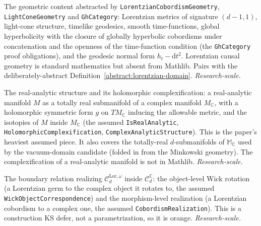 \begin{definition}
  \label{found:lorentzian-causal-geometry}
  \notready
  The geometric content abstracted by \texttt{LorentzianCobordismGeometry},
  \texttt{LightConeGeometry} and \texttt{GhCategory}: Lorentzian metrics of signature
  $(d-1,1)$, light-cone structure, timelike geodesics, smooth time-functions, global
  hyperbolicity with the closure of globally hyperbolic cobordisms under concatenation and
  the openness of the time-function condition (the \texttt{GhCategory} proof obligations),
  and the geodesic normal form $h_t - \mathrm dt^2$. Lorentzian causal
  geometry is standard mathematics but absent from Mathlib. Pairs with the
  deliberately-abstract Definition~\ref{abstract:lorentzian-domain}.
  \emph{Research-scale.}
\end{definition}

\begin{definition}
  \label{found:real-analytic-complexification}
  \notready
  The real-analytic structure and its holomorphic complexification: a real-analytic
  manifold $M$ as a totally real submanifold of a complex manifold $M_{\mathbb C}$, with a
  holomorphic symmetric form $g$ on $TM_{\mathbb C}$ inducing the allowable metric, and the
  isotopies of $M$ inside $M_{\mathbb C}$ (the assumed \texttt{IsRealAnalytic},
  \texttt{HolomorphicComplexification}, \texttt{ComplexAnalyticStructure}). This is the
  paper's heaviest assumed piece. It also covers the totally-real $d$-submanifolds of
  $\mathbb M_{\mathbb C}$ used by the vacuum-domain candidate (folded in from the
  Minkowski geometry). The complexification of a real-analytic manifold is not in Mathlib.
  \emph{Research-scale.}
\end{definition}

\begin{definition}
  \label{found:wick-correspondence}
  \notready
  The boundary relation realizing $\mathcal C_d^{\mathrm{Lor},\omega}$ inside
  $\mathcal C_d^{\mathbb C}$: the object-level Wick rotation (a Lorentzian germ to the
  complex object it rotates to, the assumed \texttt{WickObjectCorrespondence}) and the
  morphism-level realization (a Lorentzian cobordism to a complex one, the assumed
  \texttt{CobordismRealization}). This is a construction KS defer, not a parametrization, so
  it is orange. \emph{Research-scale.}
\end{definition}

